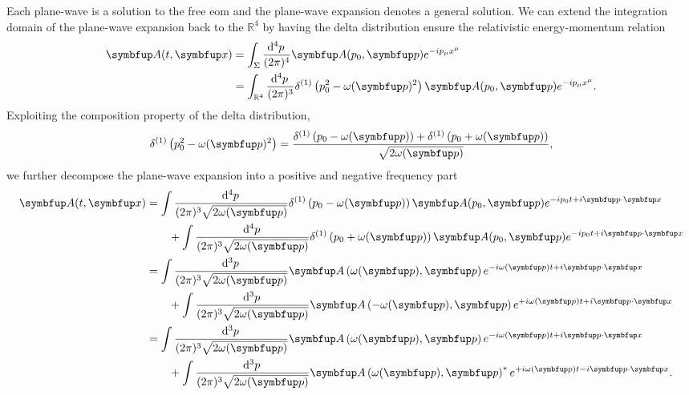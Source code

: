 Each plane-wave is a solution to the free \gls{eom} and the plane-wave expansion denotes a general solution.
We can extend the integration domain of the plane-wave expansion back to the $\mathbb{R}^4$ by having the delta distribution ensure the relativistic energy-momentum relation
\begin{equation}
	\begin{split}
		\vb{A}(t,\vb{x})
		&=
		\int_\Sigma\frac{\dd[4]{p}}{(2\pi)^4}
		\vb{A}(p_0,\vb{p})
		e^{-ip_\mu x^\mu}
		\\
		&=
		\int_{\mathbb{R}^4}\frac{\dd[4]{p}}{(2\pi)^3}
		\delta^{(1)}
		\left(
			p_0^2
			-
			\omega(\vb{p})^2
		\right)
		\vb{A}(p_0,\vb{p})
		e^{-ip_\mu x^\mu}
		.
	\end{split}
\end{equation}
Exploiting the composition property of the delta distribution,
\begin{equation}
	\delta^{(1)}
	\left(
		p_0^2
		-
		\omega(\vb{p})^2
	\right)
	=
	\frac{
		\delta^{(1)}
		\left(p_0-\omega(\vb{p})\right)
		+
		\delta^{(1)}
		\left(p_0+\omega(\vb{p})\right)
	}{\sqrt{2\omega(\vb{p})}}
	,
\end{equation}
we further decompose the plane-wave expansion into a positive and negative frequency part
\begin{equation}
	\begin{split}
		\vb{A}(t,\vb{x})
		&=
		\int\frac{\dd[4]{p}}{(2\pi)^3\sqrt{2\omega(\vb{p})}}
		\delta^{(1)}
		\left(
			p_0
			-
			\omega(\vb{p})
		\right)
		\vb{A}(p_0,\vb{p})
		e^{-ip_0t+i\vb{p}\vdot\vb{x}}
		\\
		&\qquad+
		\int\frac{\dd[4]{p}}{(2\pi)^3\sqrt{2\omega(\vb{p})}}
		\delta^{(1)}
		\left(
			p_0
			+
			\omega(\vb{p})
		\right)
		\vb{A}(p_0,\vb{p})
		e^{-ip_0t+i\vb{p}\vdot\vb{x}}
		\\
		&=
		\int\frac{\dd[3]{p}}{(2\pi)^3\sqrt{2\omega(\vb{p})}}
		\vb{A}\left(\omega(\vb{p}),\vb{p}\right)
		e^{-i\omega(\vb{p})t+i\vb{p}\vdot\vb{x}}
		\\
		&\qquad+
		\int\frac{\dd[3]{p}}{(2\pi)^3\sqrt{2\omega(\vb{p})}}
		\vb{A}\left(-\omega(\vb{p}),\vb{p}\right)
		e^{+i\omega(\vb{p})t+i\vb{p}\vdot\vb{x}}
		\\
		&=
		\int\frac{\dd[3]{p}}{(2\pi)^3\sqrt{2\omega(\vb{p})}}
		\vb{A}\left(\omega(\vb{p}),\vb{p}\right)
		e^{-i\omega(\vb{p})t+i\vb{p}\vdot\vb{x}}
		\\
		&\qquad+
		\int\frac{\dd[3]{p}}{(2\pi)^3\sqrt{2\omega(\vb{p})}}
		\vb{A}\left(\omega(\vb{p}),\vb{p}\right)^*
		e^{+i\omega(\vb{p})t-i\vb{p}\vdot\vb{x}}
		.
	\end{split}
	\label{eq:maxwell_plane_wave_expansion}
\end{equation}
